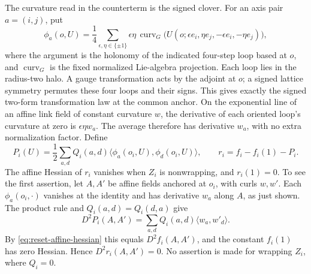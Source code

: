 The curvature read in the counterterm is the signed clover. For an
axis pair $a=(i,j)$, put
\[
 \phi_a(o,U)=\frac14\sum_{\epsilon,\eta\in\{\pm1\}}
 \epsilon\eta\,\operatorname{curv}_G
 \bigl(U(o;\epsilon e_i,\eta e_j,-\epsilon e_i,-\eta e_j)\bigr),
\]
where the argument is the holonomy of the indicated four-step loop
based at $o$, and $\operatorname{curv}_G$ is the fixed normalized
Lie-algebra projection. Each loop lies in the radius-two halo. A gauge
transformation acts by the adjoint at $o$; a signed lattice symmetry
permutes these four loops and their signs. This gives exactly the
signed two-form transformation law at the common anchor. On the
exponential line of an affine link field of constant curvature $w$,
the derivative of each oriented loop's curvature at zero is
$\epsilon\eta w_a$. The average therefore has derivative $w_a$,
with no extra normalization factor. Define
\[
 P_i(U)=\frac12\sum_{a,d}Q_i(a,d)
                  \langle\phi_a(o_i,U),\phi_d(o_i,U)\rangle,
 \qquad r_i=f_i-f_i(1)-P_i.
\]
The affine Hessian of $r_i$ vanishes when $Z_i$ is nonwrapping, and
$r_i(1)=0$. To see the first assertion, let $A,A'$ be affine fields
anchored at $o_i$, with curls $w,w'$. Each $\phi_a(o_i,\cdot)$
vanishes at the identity and has derivative $w_a$ along $A$, as just
shown. The product rule and $Q_i(a,d)=Q_i(d,a)$ give
\[
 D^2P_i(A,A')=\sum_{a,d}Q_i(a,d)\langle w_a,w'_d\rangle .
\]
By \eqref{eq:reset-affine-hessian} this equals $D^2f_i(A,A')$, and
the constant $f_i(1)$ has zero Hessian. Hence $D^2r_i(A,A')=0$.
No assertion is made for wrapping $Z_i$, where $Q_i=0$.


